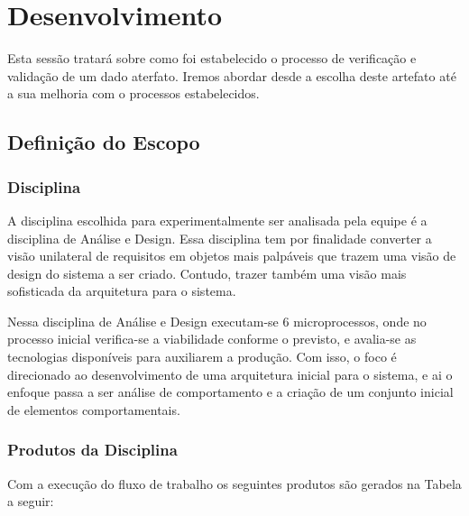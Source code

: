 \chapter[Desenvolvimento ]{Desenvolvimento}
Esta sessão tratará sobre como foi estabelecido o processo de verificação e
validação de um dado aterfato. Iremos abordar desde a escolha deste artefato até
a sua melhoria com o processos estabelecidos.
\section{Definição do Escopo}
\subsection{Disciplina }

A disciplina escolhida para experimentalmente ser analisada pela equipe é a disciplina de Análise e Design. Essa disciplina tem por finalidade converter a visão unilateral de requisitos em objetos mais palpáveis que trazem uma visão de design do sistema a ser criado. Contudo, trazer também uma visão mais sofisticada da arquitetura para o sistema.\cite{e01} 

Nessa disciplina de Análise e Design executam-se 6 microprocessos, onde no processo inicial verifica-se a viabilidade conforme o previsto, e avalia-se as tecnologias disponíveis para auxiliarem a produção. Com isso, o foco é direcionado ao desenvolvimento de uma arquitetura inicial para o sistema, e ai o enfoque passa a ser análise de comportamento e a criação de um conjunto inicial de elementos comportamentais.\cite{e02} 

\subsection{Produtos da Disciplina}
Com a execução do fluxo de trabalho os seguintes produtos são gerados na Tabela\cite{e03}  a seguir:

